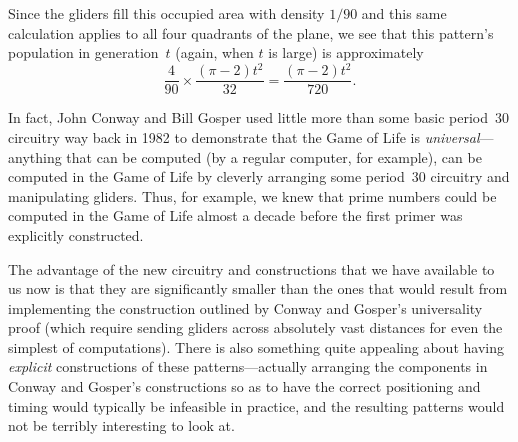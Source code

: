 \begin{itemize}
	Since the gliders fill this occupied area with density $1/90$ and this same calculation applies to all four quadrants of the plane, we see that this pattern's population in generation~$t$ (again, when $t$ is large) is approximately
	\[
		\frac{4}{90} \times \frac{(\pi-2)t^2}{32} = \frac{(\pi-2)t^2}{720}.
	\]
\end{itemize}

In fact, John Conway and Bill Gosper used little more than some basic period~$30$ circuitry way back in 1982 \cite[Chapter~25]{BCG82} to demonstrate that the Game of Life is \emph{universal}---anything that can be computed (by a regular computer, for example), can be computed in the Game of Life by cleverly arranging some period~$30$ circuitry and manipulating gliders. Thus, for example, we knew that prime numbers could be computed in the Game of Life almost a decade before the first primer was explicitly constructed.

The advantage of the new circuitry and constructions that we have available to us now is that they are significantly smaller than the ones that would result from implementing the construction outlined by Conway and Gosper's universality proof  (which require sending gliders across absolutely vast distances for even the simplest of computations). There is also something quite appealing about having \emph{explicit} constructions of these patterns---actually arranging the components in Conway and Gosper's constructions so as to have the correct positioning and timing would typically be infeasible in practice, and the resulting patterns would not be terribly interesting to look at.



